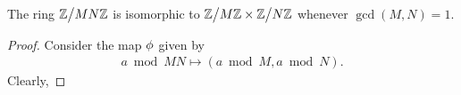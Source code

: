 \begin{theorem}
  The ring $\Z\bign/MN\Z$ is isomorphic to $\Z\bign/M\Z \times \Z\bign/N\Z$ whenever $\gcd(M,N) = 1$.
\end{theorem}
\begin{proof}
  Consider the map $\phi$ given by
  \begin{align*}
    a \bmod{MN} \mapsto (a\bmod{M}, a\bmod{N}).
  \end{align*}
  Clearly,
\end{proof}
